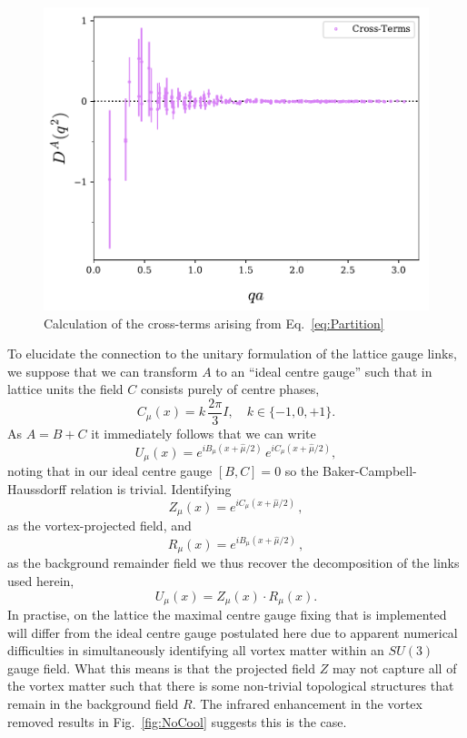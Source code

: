 \begin{figure}[htb!]
\centering
\includegraphics[width=0.9\linewidth]{./ScalarGluComp_q2_CrossTerms.pdf}
\caption{\label{fig:CrossTerms} Calculation of the cross-terms arising from Eq.~\eqref{eq:Partition}}
\end{figure} 
%

To elucidate the connection to the unitary formulation of the lattice gauge links, we suppose that we can transform $A$ to an ``ideal centre gauge'' such that in lattice units the field $C$ consists purely of centre phases,
%
\begin{equation}
C_\mu(x) = k\,\frac{2\pi}{3} I,\quad k\in \{-1,0,+1\}.
\end{equation}
%
As $A = B + C$ it immediately follows that we can write
\begin{equation}
U_{\mu}(x) = e^{i B_{\mu}(x+\hat{\mu}/2)} \, e^{i C_{\mu}(x+\hat{\mu}/2)},
\end{equation}
noting that in our ideal centre gauge $[B,C] = 0$ so the Baker-Campbell-Haussdorff relation is trivial. Identifying
\begin{equation}
Z_{\mu}(x) = e^{i C_{\mu}(x+\hat{\mu}/2)}\, ,
\end{equation}
as the vortex-projected field, and
\begin{equation}
R_{\mu}(x) = e^{i B_{\mu}(x+\hat{\mu}/2)}\, ,
\end{equation}
as the background remainder field we thus recover the decomposition of the links used herein,
\begin{equation}
U_{\mu}(x) = Z_{\mu}(x)\cdot R_{\mu}(x).
\end{equation}
In practise, on the lattice the maximal centre gauge fixing that is implemented will differ from the ideal centre gauge postulated here due to apparent numerical difficulties in simultaneously identifying all vortex matter within an $SU(3)$ gauge field. What this means is that the projected field $Z$ may not capture all of the vortex matter such that there is some non-trivial topological structures that remain in the background field $R.$ The infrared enhancement in the vortex removed results in Fig.~\ref{fig:NoCool} suggests this is the case.\\

